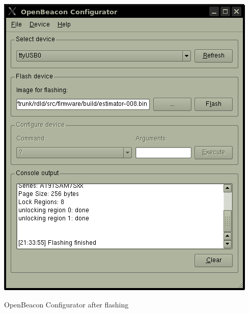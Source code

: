   \begin{staticFigure}
    \begin{center}
     \includegraphics{images/UserManual/obConfig/mainWindow-afterFlashing.png}
     \caption{OpenBeacon Configurator after flashing}
     \label{fg:userManual:obConfig:mainWindow-afterFlashing}
    \end{center}
   \end{staticFigure}

